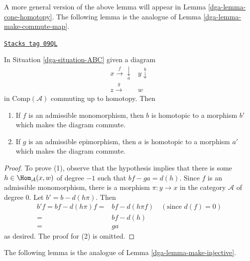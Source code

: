A more general version of the above lemma will appear in
Lemma \ref{dga-lemma-cone-homotopy}. The following lemma is the
analogue of Lemma \ref{dga-lemma-make-commute-map}.

\begin{lemma}
\label{dga-lemma-homo-change}
\href{https://stacks.math.columbia.edu/tag/09QL}{\texttt{Stacks tag 09QL}}

In Situation \ref{dga-situation-ABC} given a diagram
$$
\begin{array}{cc}x\overset{f}{\longrightarrow}\underset{a}{\downarrow} & y\overset{b}{\downarrow} \\ z\overset{g}{\longrightarrow} & w\end{array}
$$
in $\text{Comp}(\mathcal{A})$ commuting up to homotopy. Then
\begin{enumerate}
\item If $f$ is an admissible monomorphism, then $b$ is homotopic
to a morphism $b'$ which makes the diagram commute.
\item If $g$ is an admissible epimorphism, then $a$ is homotopic
to a morphism $a'$ which makes the diagram commute.
\end{enumerate}
\end{lemma}

\begin{proof}
To prove (1), observe that the hypothesis implies that there is some
$h\in\Hom_{\mathcal{A}}(x,w)$ of degree $-1$ such that $bf-ga=d(h)$.
Since $f$ is an admissible monomorphism, there is a morphism
$\pi : y \to x$ in the category $\mathcal{A}$ of degree $0$.
Let $b' = b - d(h\pi)$. Then
\begin{align*}
b'f = bf - d(h\pi)f
= &
bf - d(h\pi f) \quad (\text{since }d(f) = 0) \\
= &
bf-d(h) \\
= &
ga
\end{align*}
as desired. The proof for (2) is omitted.
\end{proof}

The following lemma is the analogue of Lemma \ref{dga-lemma-make-injective}.

